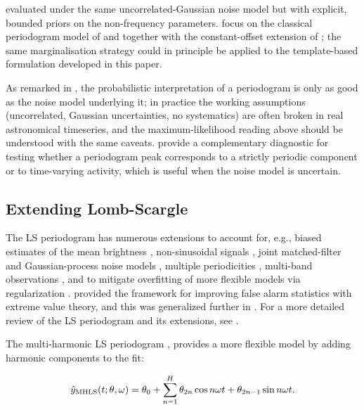 \documentclass[apj]{emulateapj}
\begin{document}
evaluated under the same uncorrelated-Gaussian noise model but with explicit,
bounded priors on the non-frequency parameters. \cite{Mortier_et_al_2015}
focus on the classical periodogram model of \cite{Lomb_1976} and
\cite{Scargle_1982} together with the constant-offset extension of
\cite{Zechmeister+Kurster_2009}; the same marginalisation strategy could in
principle be applied to the template-based formulation developed in this paper.

As remarked in \citep{Vanderplas_2018}, the probabilistic interpretation of a
periodogram is only as good as the noise model underlying it; in practice the
working assumptions (uncorrelated, Gaussian uncertainties, no systematics) are
often broken in real astronomical timeseries, and the maximum-likelihood
reading above should be understood with the same caveats. \citet{Hara_etal_2022} provide a complementary diagnostic for testing whether a periodogram peak corresponds to a strictly periodic component or to time-varying activity, which is useful when the noise model is uncertain.



\subsection{Extending Lomb-Scargle}

The LS periodogram has numerous extensions to account for, e.g., biased estimates of the mean brightness
\citep{Zechmeister+Kurster_2009}, non-sinusoidal signals \citep{Schwarzenberg-Czerny_1996,Bretthorst_2003,Palmer_2009,Baluev_2009,Baluev_2013a,Wheeler+Kipping_2019}, joint matched-filter and Gaussian-process noise models \citep{Garcia_etal_2024}, multiple periodicities \citep{Baluev_2013b,Baluev_2013c},
multi-band observations \citep{Vanderplas+Ivezic_2015}, and to mitigate overfitting of more
flexible models via regularization \citep{Vanderplas+Ivezic_2015}. \cite{Baluev_2008} provided the framework for improving false alarm statistics with extreme value theory, and this was generalized further in \cite{Baluev_2013b}. For a more detailed review
of the LS periodogram and its extensions, see \cite{Vanderplas_2018}.

The multi-harmonic LS periodogram \citep[][MHGLS]{Bretthorst+Chi-Cheng_1988,Schwarzenberg-Czerny_1996,Palmer_2009}, provides a more
flexible model by adding harmonic components to the fit:

\begin{equation}
    \hat{y}_{\rm MHLS}(t;\theta, \omega) = \theta_0 + \sum_{n=1}^H \theta_{2n}\cos{n\omega t} + \theta_{2n-1}\sin{n\omega t}.
\end{equation}
\end{document}
